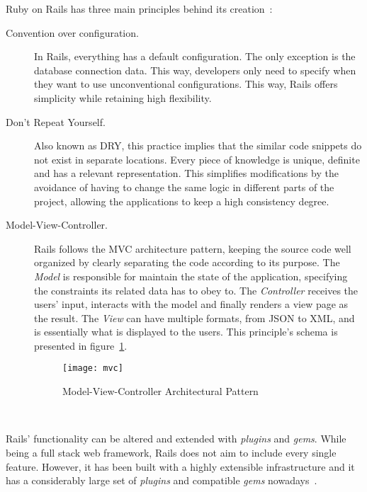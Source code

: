 Ruby on Rails has three main principles behind its creation~\cite{agile_webdevelopment_with_rails, ruby_on_rails_principles}:
\begin{description}
\item[Convention over configuration.] In Rails, everything has a default configuration. The only exception is the database connection data. This way, developers only need to specify when they want to use unconventional configurations. This way, Rails offers simplicity while retaining high flexibility.
\item[Don't Repeat Yourself.] Also known as DRY, this practice implies that the similar code snippets do not exist in separate locations. Every piece of knowledge is unique, definite and has a relevant representation. This simplifies modifications by the avoidance of having to change the same logic in different parts of the project, allowing the applications to keep a high consistency degree.
\item[Model-View-Controller.] Rails follows the MVC architecture pattern, keeping the source code well organized by clearly separating the code according to its purpose. The \textit{Model} is responsible for maintain the state of the application, specifying the constraints its related data has to obey to. The \textit{Controller} receives the users' input, interacts with the model and finally renders a view page as the result. The \textit{View} can have multiple formats, from JSON to XML, and is essentially what is displayed to the users. This principle's schema is presented in figure~\ref{fig:mvc}.
\begin{figure}[h]
  \centering
  \caption{Model-View-Controller Architectural Pattern}
  \label{fig:mvc}
    \texttt{[image: mvc]}
\end{figure}\\
\end{description}
Rails' functionality can be altered and extended with \textit{plugins} and \textit{gems}. While being a full stack web framework, Rails does not aim to include every single feature. However, it has been built with a highly extensible infrastructure and it has a considerably large set of \textit{plugins} and compatible \textit{gems} nowadays~\cite{rails_magazine_1}.


